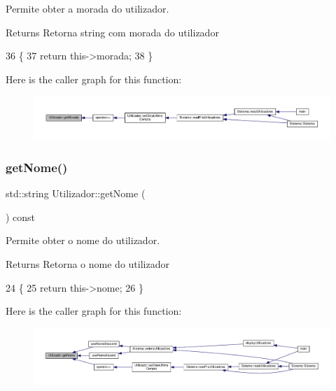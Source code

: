 Permite obter a morada do utilizador. 

\begin{DoxyReturn}{Returns}
Retorna string com morada do utilizador 
\end{DoxyReturn}

\begin{DoxyCode}
36                                       \{
37     \textcolor{keywordflow}{return} this->morada;
38 \}
\end{DoxyCode}
Here is the caller graph for this function\+:
\nopagebreak
\begin{figure}[H]
\begin{center}
\leavevmode
\includegraphics[width=350pt]{classUtilizador_aea27372a36fb8e59d2f3029464d83101_icgraph}
\end{center}
\end{figure}
\mbox{\label{classUtilizador_a82874cffab116aa572f58576511b0e24}} 
\subsubsection{\texorpdfstring{get\+Nome()}{getNome()}}
{\footnotesize\ttfamily std\+::string Utilizador\+::get\+Nome (\begin{DoxyParamCaption}{ }\end{DoxyParamCaption}) const}



Permite obter o nome do utilizador. 

\begin{DoxyReturn}{Returns}
Retorna o nome do utilizador 
\end{DoxyReturn}

\begin{DoxyCode}
24                                     \{
25     \textcolor{keywordflow}{return} this->nome;
26 \}
\end{DoxyCode}
Here is the caller graph for this function\+:
\nopagebreak
\begin{figure}[H]
\begin{center}
\leavevmode
\includegraphics[width=350pt]{classUtilizador_a82874cffab116aa572f58576511b0e24_icgraph}
\end{center}
\end{figure}
\mbox{\label{classUtilizador_a8624e9e45e13e592e68164b0d7b2b7cd}} 
